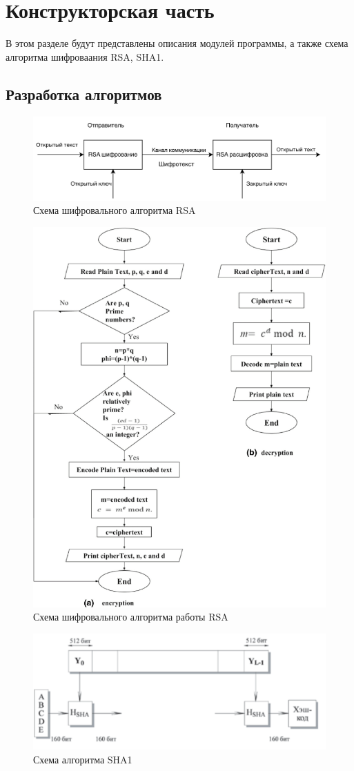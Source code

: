 \chapter{Конструкторская часть}

В этом разделе будут представлены описания модулей программы, а также схема алгоритма шифроваания RSA, SHA1.

\section{Разработка алгоритмов}

\begin{figure}[ht!]
	\centering
	\includegraphics[width=0.6\linewidth]{img/rsa.png}
	\caption{Схема шифровального алгоритма RSA}
	\label{img:rsa}
\end{figure}


\begin{figure}[ht!]
	\centering
	\includegraphics[width=0.6\linewidth]{img/rsa_work.png}
	\caption{Схема шифровального алгоритма работы RSA}
	\label{img:rsa_work}
\end{figure}

\begin{figure}[ht!]
	\centering
	\includegraphics[width=0.8\linewidth]{img/sha-1.png}
	\caption{Схема алгоритма SHA1}
	\label{img:sha1}
\end{figure}

